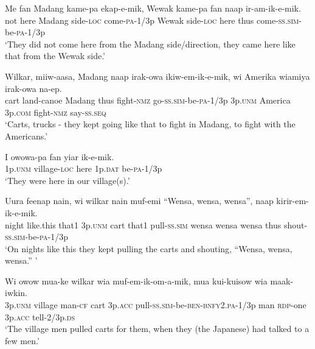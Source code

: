 \ea\label{ex:a:x33}
\gll  Me  fan  Madang  kame-pa  ekap-e-mik, Wewak  kame-pa  fan  naap  ir-am-ik-e-mik. \\
not  here  Madang  side-\textsc{loc}  come-\textsc{pa}-1/3p Wewak  side-\textsc{loc}  here  thus  come-\textsc{ss}.\textsc{sim}-be-\textsc{pa}-1/3p\\ 
\glt ‘They did not come here from the Madang side/direction, they came here like that from the Wewak side.’ \\
\z


\ea\label{ex:a:x34}
\gll  Wilkar,  miiw-aasa,  Madang  naap  irak-owa  ikiw-em-ik-e-mik, wi  Amerika  wiamiya  irak-owa  na-ep. \\
cart  land-canoe  Madang  thus  fight-\textsc{nmz}  go-\textsc{ss}.\textsc{sim}-be-\textsc{pa}-1/3p 3p.\textsc{unm}  America  3p.\textsc{com}  fight-\textsc{nmz}  say{}-\textsc{ss.seq}\\ 
\glt ‘Carts, trucks - they kept going like that to fight in Madang, to fight with the Americans.’ \\
\z


\ea\label{ex:a:x35}
\gll  I  owowa-pa  fan  yiar  ik-e-mik. \\
1p.\textsc{unm}  village-\textsc{loc}  here  1p.\textsc{dat}  be-\textsc{pa}-1/3p \\
\glt ‘They were here in our village(s).’ \\
\z


\ea\label{ex:a:x36}
\gll  Uura  feenap  nain,  wi  wilkar  nain  muf-emi “Wensa,  wensa,  wensa”,  naap  kirir-em-ik-e-mik.\\
night  like.this  that1  3p.\textsc{unm}  cart  that1  pull-\textsc{ss}.\textsc{sim} wensa  wensa  wensa  thus  shout-\textsc{ss}.\textsc{sim}-be-\textsc{pa}-1/3p \\ 
\glt ‘On nights like this they kept pulling the carts and shouting, “Wensa, wensa, wensa.” ’ \\
\z


\ea\label{ex:a:x37}
\gll  Wi  owow  mua-ke  wilkar  wia muf-em-ik-om-a-mik,  mua  kui-kuisow wia  maak-iwkin.\\
3p.\textsc{unm}  village  man-\textsc{cf}  cart  3p.\textsc{acc} pull-\textsc{ss}.\textsc{sim}-be-\textsc{ben}-\textsc{bnfy}2.\textsc{pa}-1/3p  man  \textsc{rdp}-one 3p.\textsc{acc}  tell-2/3p.\textsc{ds}\\ 
\glt ‘The village men pulled carts for them, when they (the Japanese) had talked to a few men.’ \\
\z


